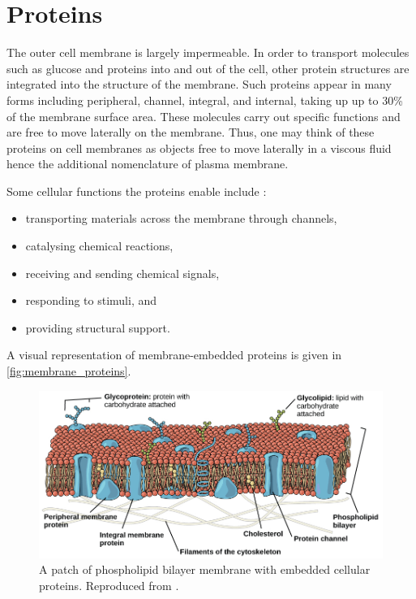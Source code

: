 \documentclass{report}
\begin{document}
\section{Proteins}
The outer cell membrane is largely impermeable. In order to transport molecules such as glucose and proteins into and out of the cell, other protein structures are integrated into the structure of the membrane. Such proteins appear in many forms including peripheral, channel, integral, and internal, taking up up to 30\% of the membrane surface area. These molecules carry out specific functions and are free to move laterally on the membrane. Thus, one may think of these proteins on cell membranes as objects free to move laterally in a viscous fluid \cite{marrink2019computational} hence the additional nomenclature of plasma membrane.

Some cellular functions the proteins enable include \cite{alberts2002protein}:
\begin{itemize}
	\item transporting materials across the membrane through channels,
	\item catalysing chemical reactions,
	\item receiving and sending chemical signals,
	\item responding to stimuli, and
	\item providing structural support.
\end{itemize}

A visual representation of membrane-embedded proteins is given in \autoref{fig:membrane_proteins}.

\begin{figure}
	\centering
	\includegraphics[width = \textwidth]{membrane_proteins.png}
	\caption{A patch of phospholipid bilayer membrane with embedded cellular proteins. Reproduced from \cite{openstax2012plasma}.}
	\label{fig:membrane_proteins}
\end{figure}
\end{document}
